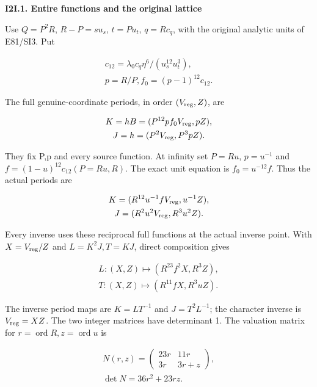 \medskip\noindent\textbf{I2I.1. Entire functions and the original lattice}

\par\nobreak

Use \(Q=P^{2}R\), \(R-P=s u_s\), \(t=P u_t\), \(q=R c_q\), with the original
analytic units of E81/SI3. Put

\[
\begin{gathered}
c_{12}=\lambda_0 c_q \eta^{6}/(u_s^{12} u_t^{3}), \\
p=R/P, f_{0}=(p-1)^{12} c_{12}.
\end{gathered}
\]

The full genuine-coordinate periods, in order \((V_{\rm reg},Z)\), are

\[
\begin{gathered}
K=hB=(P^{12} p f_{0} V_{\rm reg},pZ), \\
J=h=(P^{2} V_{\rm reg},P^{3}pZ).
\end{gathered}
\]

They fix P,p and every source function. At infinity set \(P=Ru\),
\(p=u^{-1}\) and \(f=(1-u)^{12} c_{12}(P=Ru,R)\). The exact unit equation is
\(f_{0}=u^{-12} f\). Thus the actual periods are

\[
\begin{gathered}
K=(R^{12} u^{-1} f V_{\rm reg},u^{-1} Z), \\
J=(R^{2}u^{2} V_{\rm reg},R^{3}u^{2} Z).
\end{gathered}
\]

Every inverse uses these reciprocal full functions at the actual
inverse point. With \(X=V_{\rm reg}/Z\) and \(L=K^{2}J,T=KJ\), direct composition
gives

\[
\begin{gathered}
L:(X,Z)\longmapsto (R^{23} f^{2} X,R^{3} Z), \\
T:(X,Z)\longmapsto (R^{11} f X,R^{3}u Z).
\end{gathered}
\]

The inverse period maps are \(K=L T^{-1}\) and \(J=T^{2} L^{-1}\); the character
inverse is \(V_{\rm reg}=XZ\). The two integer matrices have determinant 1.
The valuation matrix for \(r=\operatorname{ord} R,z=\operatorname{ord} u\) is

\[
\begin{gathered}
N(r,z)=\begin{pmatrix}23r&11r\\3r&3r+z\end{pmatrix}, \\
\operatorname{det} N=36r^{2}+23rz.
\end{gathered}
\]

